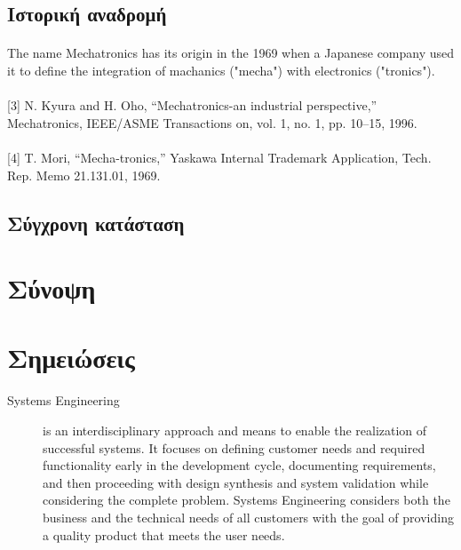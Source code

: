 \documentclass[a4paper,12pt,twoside]{report}
\begin{document}
{		\subsection{Ιστορική αναδρομή}
			
			\paragraph{}{The name Mechatronics has its origin in the 1969 when a Japanese company used it to define the integration of machanics ("mecha") with electronics ("tronics"). \cite{TheMechatronicComponent:Thramboulidis2008}
			}
			\paragraph{}{[3] N. Kyura and H. Oho, “Mechatronics-an industrial perspective,” Mechatronics, IEEE/ASME Transactions on, vol. 1, no. 1, pp. 10–15, 1996.
			}
			\paragraph{}{[4] T. Mori, “Mecha-tronics,” Yaskawa Internal Trademark Application, Tech. Rep. Memo 21.131.01, 1969.
			}
			
		\subsection{Σύγχρονη κατάσταση}
		
		\section{Σύνοψη}
		
		\section{Σημειώσεις}
		
			\begin{description}
				\item [Systems Engineering] is an interdisciplinary approach and means to enable the realization of successful systems. It focuses on defining customer needs and required functionality  early in the development cycle, documenting requirements, and then proceeding with design synthesis  and system validation while considering the complete problem. Systems Engineering considers both  the business and the technical needs of all customers with the goal of providing a quality product  that meets the user needs. \cite{IncoseSEH}
			\end{description}
			
}
\end{document}
